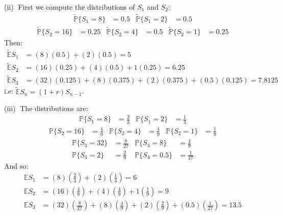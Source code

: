 \documentclass[12pt, letterpaper]{article}
\begin{document}
\rightline{$\square$}

\vspace{5mm}
\noindent
(ii)$\;$ First we compute the distributions of $S_1$ and $S_2$:
\begin{align*}
    \tilde{\mathbb P} \{ S_1 = 8 \} &= 0.5 & \tilde{\mathbb P} \{ S_1 = 2 \} &= 0.5
\end{align*}
\begin{align*}
    \tilde{\mathbb P} \{ S_2 =  16\} &= 0.25 & \tilde{\mathbb P} \{ S_2 = 4 \} &= 0.5
    & \tilde{\mathbb P} \{ S_2 = 1 \} &= 0.25
\end{align*}
Then:
\begin{align*}
    \tilde{\mathbb E} S_1 &= (8)(0.5)+(2)(0.5) = 5 \\
    \tilde{\mathbb E} S_2 &= (16)(0.25)+(4)(0.5) + 1(0.25) = 6.25 \\
    \tilde{\mathbb E} S_3 &= (32)(0.125)+(8)(0.375)+(2)(0.375)+(0.5)(0.125) = 7.8125
\end{align*}
i.e: $\tilde{\mathbb E} S_n = (1+r)S_{n-1}$.

\rightline{$\square$}

\vspace{5mm}
\noindent
(iii)$\;$ The distributions are:
\begin{align*}
    \mathbb P \{ S_1 = 8 \} &= \tfrac 2 3 & \mathbb P \{ S_1 = 2 \} &= \tfrac 1 3
\end{align*}
\begin{align*}
    \mathbb P \{ S_2 =  16\} &= \tfrac 4 9 & \mathbb P \{ S_2 = 4 \} &= \tfrac 4 9
    & \mathbb P \{ S_2 = 1 \} &= \tfrac 1 9
\end{align*}
\begin{align*}
    \mathbb P \{ S_3 = 32 \} &= \tfrac 8 {27}  & \mathbb P \{ S_3 = 8 \} &= \tfrac 4 9  \\
    \mathbb P \{ S_3 = 2 \} &= \tfrac 2 9 & \mathbb P \{ S_3 = 0.5 \} &= \tfrac 1 {27}
\end{align*}
And so:
\begin{align*}
    \mathbb E S_1 &= (8) \left(\tfrac 2 3 \right)+(2)\left(\tfrac 1 3 \right) = 6 \\
    \mathbb E S_2 &= (16)\left(\tfrac 4 9 \right)+(4)\left(\tfrac 4 9 \right) + 1\left(\tfrac 1 9 \right) = 9 \\
    \mathbb E S_3 &= (32)\left(\tfrac 8 {27} \right)+(8)\left(\tfrac 4 9 \right)+(2)\left(\tfrac 2 9 \right)+(0.5)\left(\tfrac 1 {27} \right) = 13.5
\end{align*}
\end{document}
